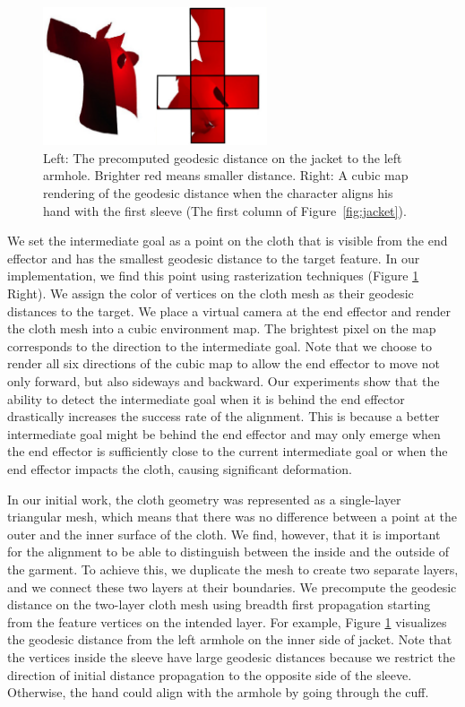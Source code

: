 \begin{figure}[!t]
  \centering
  \includegraphics[width=2.6in]{images/geodesic}
  \caption{Left: The precomputed geodesic distance on the jacket to the left armhole. Brighter red means smaller distance. Right: A cubic map rendering of the geodesic distance when the character aligns his hand with the first sleeve (The first column of Figure~\ref{fig:jacket}).}
  \label{fig:geodesic}
\end{figure}


We set the intermediate goal as a point on the cloth that is visible from the end effector and has the smallest geodesic distance to the target feature. In our implementation, we find this point using rasterization techniques (Figure \ref{fig:geodesic} Right). We assign the color of vertices on the cloth mesh as their geodesic distances to the target. We place a virtual camera at the end effector and render the cloth mesh into a cubic environment map. The brightest pixel on the map corresponds to the direction to the intermediate goal. Note that we choose to render all six directions of the cubic map to allow the end effector to move not only forward, but also sideways and backward. Our experiments show that the ability to detect the intermediate goal when it is behind the end effector drastically increases the success rate of the alignment. This is because a better intermediate goal might be behind the end effector and may only emerge when the end effector is sufficiently close to the current intermediate goal or when the end effector impacts the cloth, causing significant deformation.

In our initial work, the cloth geometry was represented as a single-layer triangular mesh, which means that there was no difference between a point at the outer and the inner surface of the cloth. We find, however, that it is important for the alignment to be able to distinguish between the inside and the outside of the garment.  To achieve this, we duplicate the mesh to create two separate layers, and we connect these two layers at their boundaries. We precompute the geodesic distance on the two-layer cloth mesh using breadth first propagation starting from the feature vertices on the intended layer. For example, Figure \ref{fig:geodesic} visualizes the geodesic distance from the left armhole on the inner side of jacket. Note that the vertices inside the sleeve have large geodesic distances because we restrict the direction of initial distance propagation to the opposite side of the sleeve. Otherwise, the hand could align with the armhole by going through the cuff. 

